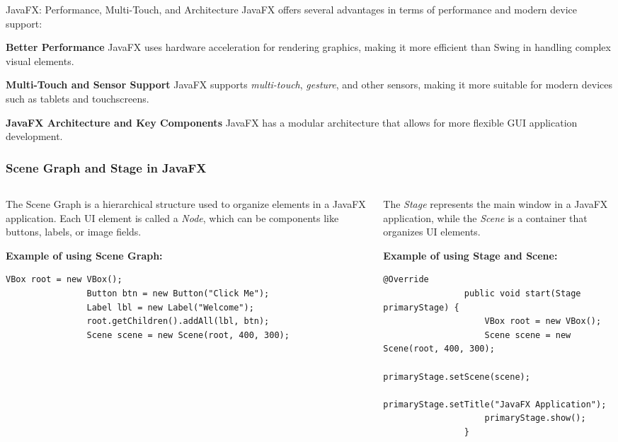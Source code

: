 \documentclass[aspectratio=169, table]{beamer}
\begin{document}
\begin{frame}{\LARGE{JavaFX: Performance, Multi-Touch, and Architecture}}
	\vspace{20pt}
	JavaFX offers several advantages in terms of performance and modern device support:
	
	\bigskip
	\textbf{Better Performance}  
	JavaFX uses hardware acceleration for rendering graphics, making it more efficient than Swing in handling complex visual elements.
	
	\bigskip
	\textbf{Multi-Touch and Sensor Support}  
	JavaFX supports \textit{multi-touch}, \textit{gesture}, and other sensors, making it more suitable for modern devices such as tablets and touchscreens.
	
	\bigskip
	\textbf{JavaFX Architecture and Key Components}  
	JavaFX has a modular architecture that allows for more flexible GUI application development.
\end{frame}


\begin{frame}[fragile]
	\frametitle{Scene Graph and Stage in JavaFX}
	\vspace{25pt}
	\begin{columns}[t]
		\begin{column}{0.5\textwidth}
			The Scene Graph is a hierarchical structure used to organize elements in a JavaFX application.  
			Each UI element is called a \textit{Node}, which can be components like buttons, labels, or image fields.
			
			\bigskip
			\textbf{Example of using Scene Graph:}
			
			\begin{lstlisting}[style=JavaStyle]
				VBox root = new VBox();
				Button btn = new Button("Click Me");
				Label lbl = new Label("Welcome");
				root.getChildren().addAll(lbl, btn);
				Scene scene = new Scene(root, 400, 300);
			\end{lstlisting}
		\end{column}
		\begin{column}{0.5\textwidth}
			The \textit{Stage} represents the main window in a JavaFX application,  
			while the \textit{Scene} is a container that organizes UI elements.
			
			\bigskip
			\textbf{Example of using Stage and Scene:}
			
			\begin{lstlisting}[style=JavaStyle]
				@Override
				public void start(Stage primaryStage) {
					VBox root = new VBox();
					Scene scene = new Scene(root, 400, 300);
					primaryStage.setScene(scene);
					primaryStage.setTitle("JavaFX Application");
					primaryStage.show();
				}
			\end{lstlisting}
		\end{column}
	\end{columns}
\end{frame}
\end{document}
